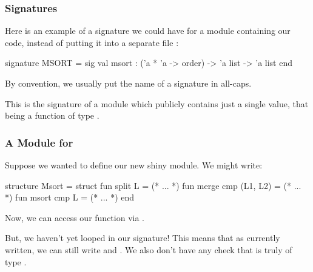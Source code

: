 \documentclass[aspectratio=169]{beamer}
\begin{document}
\begin{frame}[fragile]
  \frametitle{Signatures}


  \vspace{\fill}

  Here is an example of a signature we could have for a module containing our
   code, instead of putting it into a separate file :

  \begin{codeblock}
    signature MSORT =
      sig 
        val msort : ('a * 'a -> order) -> 'a list -> 'a list
      end
  \end{codeblock}

  \vspace{\fill}

  By convention, we usually put the name of a signature in all-caps.

  \vspace{\fill}

  This is the signature of a module which publicly contains just a single value,
  that being a function  of type .
\end{frame}

\begin{frame}[fragile]
  \frametitle{A Module for }

  Suppose we wanted to define our new shiny  module. We might write:

  \begin{codeblock}
    structure Msort =
      struct 
        fun split L = (* ... *)
        fun merge cmp (L1, L2) = (* ... *)
        fun msort cmp L = (* ... *)
      end
  \end{codeblock}

  \vspace{\fill}

  Now, we can access our  function via .

  \vspace{\fill}

  But, we haven't yet looped in our  signature! This means that
  as currently written, we can still write  and .
  We also don't have any check that  is truly of type 
  .
\end{frame}
\end{document}
